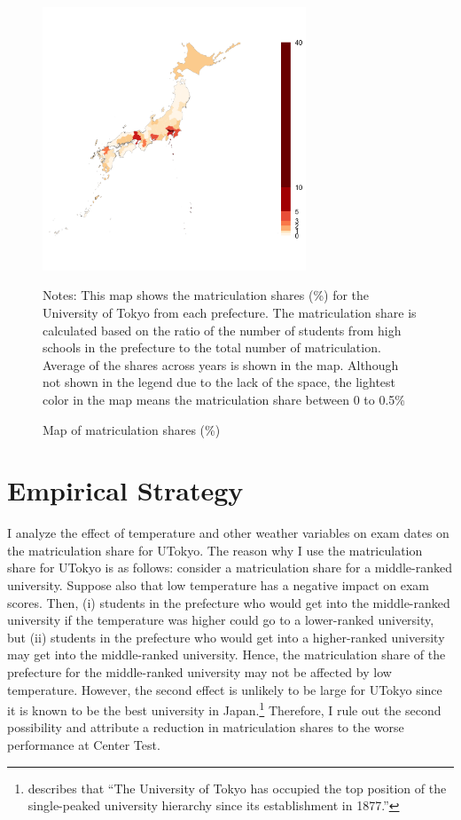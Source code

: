\documentclass[12pt,letterpaper]{article}
\begin{document}
\begin{figure}[H]
  \centering
  \caption{Map of matriculation shares (\%)}
  \includegraphics[width = 0.7\textwidth]{../Output/images/admission_map.png}
  \label{fig:admission_map}
  \footnotesize
  \begin{tablenotes}
    \item Notes:
      This map shows the matriculation shares (\%) for the University of Tokyo from each prefecture.
      The matriculation share is calculated based on the ratio of the number of students from high schools in the prefecture to the total number of matriculation.
      Average of the shares across years is shown in the map.
      Although not shown in the legend due to the lack of the space, the lightest color in the map means the matriculation share between 0 to 0.5\% 
  \end{tablenotes}
\end{figure}

\section{Empirical Strategy}\label{sec:empirical_strategy}

I analyze the effect of temperature and other weather variables on exam dates on the matriculation share for UTokyo.
The reason why I use the matriculation share for UTokyo is as follows:
consider a matriculation share for a middle-ranked university.
Suppose also that low temperature has a negative impact on exam scores.
Then, 
(i) students in the prefecture who would get into the middle-ranked university if the temperature was higher could go to a lower-ranked university, but
(ii) students in the prefecture who would get into a higher-ranked university may get into the middle-ranked university.
Hence, the matriculation share of the prefecture for the middle-ranked university may not be affected by low temperature.
However, the second effect is unlikely to be large for UTokyo since it is known to be the best university in Japan.\footnote{
  \citet{Kawaguchi2008} describes that ``The University of Tokyo has occupied the top position of the single-peaked university hierarchy since its establishment in 1877.''
}
Therefore, I rule out the second possibility and attribute a reduction in matriculation shares to the worse performance at Center Test.
\end{document}
